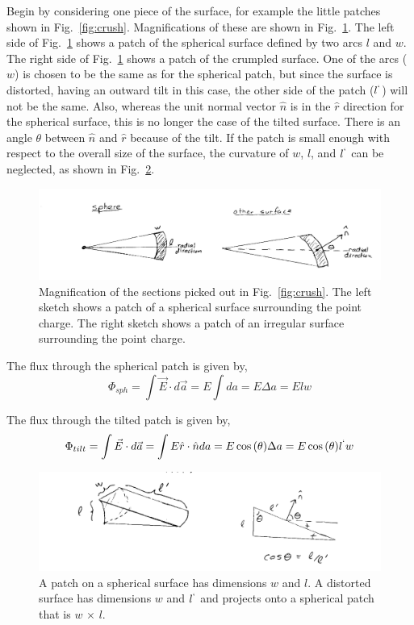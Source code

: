 \documentclass[12pt]{article}
\begin{document}
\begin{flushleft}
Begin by considering one piece of the surface, for example the little patches shown in Fig.~\ref{fig:crush}.  Magnifications of these are shown in Fig.~\ref{fig:sections}.  The left side of Fig.~\ref{fig:sections} shows a patch of the spherical surface defined by two arcs $l$ and $w$.  The right side of Fig.~\ref{fig:sections} shows a patch of the crumpled surface.  One of the arcs ($w$) is chosen to be the same as for the spherical patch, but since the surface is distorted, having an outward tilt in this case, the other side of the patch ($l^{`}$) will not be the same.  Also, whereas the unit normal vector $\hat{n}$ is in the $\hat{r}$ direction for the spherical surface, this is no longer the case of the tilted surface.  There is an angle $\theta$ between $\hat{n}$ and $\hat{r}$ because of the tilt.  If the patch is small enough with respect to the overall size of the surface, the curvature of $w$, $l$, and $l^{`}$ can be neglected, as shown in Fig.~\ref{fig:tilted}.

\begin{figure}[h]
\centering
\includegraphics*[trim=1cm 0cm 0cm 0cm, clip=true, width=0.6\columnwidth]{Gauss_shape1.png}
\caption{\small Magnification of the sections picked out in Fig.~\ref{fig:crush}.  The left sketch shows a patch of a  spherical surface surrounding the point charge.  The right sketch shows a patch of an irregular surface surrounding the point charge. }
\label{fig:sections}
\end{figure}

The flux through the spherical patch is given by,
\[
\Phi_{sph} = \int \vec{E} \cdot d\vec{a} = E \int da = E\Delta a = Elw
\]

The flux through the tilted patch is given by,
\[
\Phi_{tilt} = \int \vec{E} \cdot d\vec{a} =\int E\hat{r} \cdot \hat{n}da = E\cos{(\theta)}\Delta a = E\cos{(\theta)}l^{`}w
\]

\begin{figure}[h]
\centering
\includegraphics*[trim=1cm 0cm 0cm 0cm, clip=true, width=0.6\columnwidth]{Gauss_shape2.png}
\caption{\small A patch on a spherical surface has dimensions $w$ and $l$.  A distorted surface has dimensions $w$ and $l^{`}$ and projects onto a spherical patch that is $w\, \times \, l$.}
\label{fig:tilted}
\end{figure}


\end{flushleft}
\end{document}
